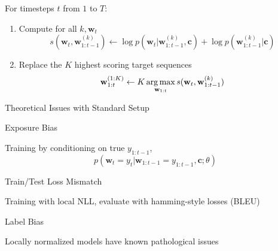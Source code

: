 \documentclass{beamer}
\let\tempone\itemize
\let\temptwo\enditemize
\renewenvironment{itemize}{\tempone\addtolength{\itemsep}{0.5\baselineskip}}{\temptwo}
\newcommand{\air}{\vspace{0.25cm}}
\newcommand{\wvec}{\mathbf{w}}
\newcommand{\cvec}{\mathbf{c}}
\newcommand{\Cite}[1]{{\footnotesize \citep{#1}}}
\def\argmax{\operatornamewithlimits{arg\,max}}
\def\argmax{\operatornamewithlimits{arg\,max}}
\begin{document}
\begin{frame}[fragile]
\begin{center}
    \end{center}
    \air

For timesteps $t$ from  $1$ to $T$:
   \begin{enumerate}
   \item Compute for all $k, \wvec_{t}$
     \[s(\wvec_t, \wvec_{1:t-1}^{(k)}) \gets \log p(\wvec_{t} | \wvec^{(k)}_{1:t-1}, \cvec) + \log p(\wvec^{(k)}_{1:t-1}| \cvec) \]
   \item Replace the $K$ highest scoring target sequences
     \[\wvec_{1:t}^{(1:K)} \gets K\argmax_{\wvec_{1:t}} s(\wvec_t, \wvec_{1:t-1}^{(k)})\]  
   \end{enumerate}

\end{frame}

\begin{frame}
  \centerline{Theoretical \alert{Issues} with Standard Setup}
  \begin{itemize}

  \item Exposure Bias
    \begin{itemize}
    \item Training by conditioning on true $y_{1:t-1}$, 
      \[ p(\wvec_{t} = y_t | \wvec_{1:t-1} = y_{1:t-1}, \cvec; \theta)\]
    \end{itemize}
    \air
  \item Train/Test Loss Mismatch 
    \begin{itemize}
    \item Training with local NLL, evaluate with hamming-style losses (BLEU)  
    \end{itemize}

    \air
  \item Label Bias  \Cite{Lafferty2001}
    \begin{itemize}
    \item Locally normalized models have known pathological issues
    \end{itemize}

  \end{itemize}
\end{frame}
\end{document}
